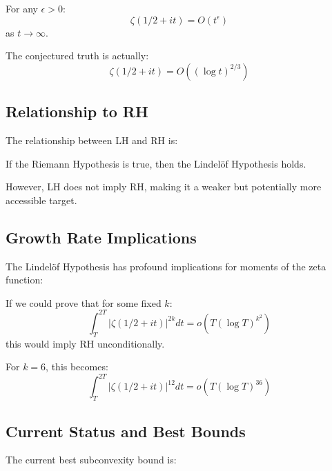 \begin{hypothesis}
For any $\epsilon > 0$:
\begin{equation}
\zeta(1/2 + it) = O(t^{\epsilon})
\end{equation}
as $t \to \infty$.
\end{hypothesis}

The conjectured truth is actually:
\begin{equation}
\zeta(1/2 + it) = O((\log t)^{2/3})
\end{equation}

\subsection{Relationship to RH}

The relationship between LH and RH is:

\begin{theorem}[RH Implies LH]
If the Riemann Hypothesis is true, then the Lindelöf Hypothesis holds.
\end{theorem}

However, LH does not imply RH, making it a weaker but potentially more accessible target.

\subsection{Growth Rate Implications}

The Lindelöf Hypothesis has profound implications for moments of the zeta function:

\begin{theorem}
If we could prove that for some fixed $k$:
\begin{equation}
\int_T^{2T} |\zeta(1/2 + it)|^{2k} dt = o(T(\log T)^{k^2})
\end{equation}
this would imply RH unconditionally.
\end{theorem}

For $k = 6$, this becomes:
\begin{equation}
\int_T^{2T} |\zeta(1/2 + it)|^{12} dt = o(T(\log T)^{36})
\end{equation}

\subsection{Current Status and Best Bounds}

The current best subconvexity bound is:

